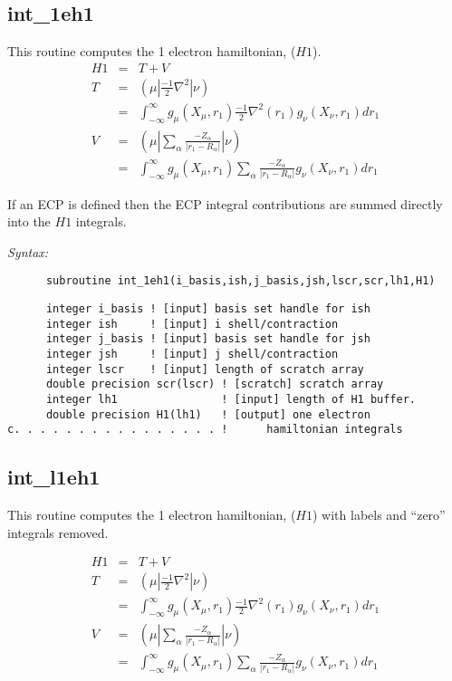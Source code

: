 \subsection{int\_1eh1} 
This routine computes the 1 electron hamiltonian, ($H1$). 
\begin{eqnarray*} 
H1 & = & T + V      \\ 
T  & = & ({\mu}|\frac{-1}{2}\nabla^{2}|{\nu}) \\ 
   & = & \int_{-\infty}^{\infty} g_{\mu}(X_{\mu},r_{1})\frac{-1}{2} 
\nabla^{2}(r_{1})g_{\nu}(X_{\nu},r_{1})dr_{1} \\ 
V  & = & ({\mu}|\sum_{\alpha}\frac{-Z_{\alpha}}{|r_{1}-R_{\alpha}|}|{\nu}) \\ 
   & = & \int_{-\infty}^{\infty} g_{\mu}(X_{\mu},r_{1})\sum_{\alpha}\frac 
{-Z_{\alpha}}{|r_{1}-R_{\alpha}|}g_{\nu}(X_{\nu},r_{1})dr_{1}  
\end{eqnarray*} 
 
If an ECP is defined then the ECP integral contributions are summed  
directly into the $H1$ integrals.   
 
{\it Syntax:} 
\begin{verbatim} 
      subroutine int_1eh1(i_basis,ish,j_basis,jsh,lscr,scr,lh1,H1) 
\end{verbatim} 
\begin{verbatim} 
      integer i_basis ! [input] basis set handle for ish 
      integer ish     ! [input] i shell/contraction 
      integer j_basis ! [input] basis set handle for jsh 
      integer jsh     ! [input] j shell/contraction 
      integer lscr    ! [input] length of scratch array 
      double precision scr(lscr) ! [scratch] scratch array 
      integer lh1                ! [input] length of H1 buffer. 
      double precision H1(lh1)   ! [output] one electron 
c. . . . . . . . . . . . . . . . !      hamiltonian integrals 
\end{verbatim} 
\subsection{int\_l1eh1} 
This routine computes the 1 electron hamiltonian, ($H1$) 
with labels and ``zero'' integrals removed.  
 
\begin{eqnarray*} 
H1 & = & T + V      \\ 
T  & = & ({\mu}|\frac{-1}{2}\nabla^{2}|{\nu}) \\ 
   & = & \int_{-\infty}^{\infty} g_{\mu}(X_{\mu},r_{1})\frac{-1}{2} 
\nabla^{2}(r_{1})g_{\nu}(X_{\nu},r_{1})dr_{1} \\ 
V  & = & ({\mu}|\sum_{\alpha}\frac{-Z_{\alpha}}{|r_{1}-R_{\alpha}|}|{\nu}) \\ 
   & = & \int_{-\infty}^{\infty} g_{\mu}(X_{\mu},r_{1})\sum_{\alpha}\frac 
{-Z_{\alpha}}{|r_{1}-R_{\alpha}|}g_{\nu}(X_{\nu},r_{1})dr_{1}  
\end{eqnarray*} 
 
